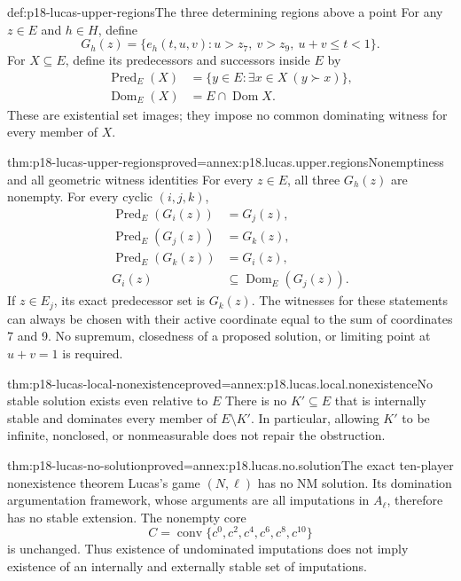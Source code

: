 \begin{hbdefinition}{def:p18-lucas-upper-regions}{The three determining regions above a point}
For any \(z\in E\) and \(h\in H\), define
\[
 G_h(z)=\{e_h(t,u,v):u>z_7,\ v>z_9,\ u+v\leq t<1\}.
\]
For \(X\subseteq E\), define its predecessors and successors
inside \(E\) by
\[
\begin{aligned}
 \operatorname{Pred}_E(X)&=\{y\in E:\exists x\in X\ (y\succ x)\},\\
 \operatorname{Dom}_E(X)&=E\cap\operatorname{Dom}X.
\end{aligned}
\]
These are existential set images; they impose no common
dominating witness for every member of \(X\).
\end{hbdefinition}

\begin{hblemma}{thm:p18-lucas-upper-regions}{proved=annex:p18.lucas.upper.regions}{Nonemptiness and all geometric witness identities}
For every \(z\in E\), all three \(G_h(z)\) are nonempty. For
every cyclic \((i,j,k)\),
\[
\begin{aligned}
 \operatorname{Pred}_E(G_i(z))&=G_j(z),\\
 \operatorname{Pred}_E(G_j(z))&=G_k(z),\\
 \operatorname{Pred}_E(G_k(z))&=G_i(z),\\
 G_i(z)&\subseteq\operatorname{Dom}_E(G_j(z)).
\end{aligned}
\]
If \(z\in E_j\), its exact predecessor set is \(G_k(z)\).
The witnesses for these statements can always be chosen with
their active coordinate equal to the sum of coordinates 7 and
9. No supremum, closedness of a proposed solution, or limiting
point at \(u+v=1\) is required.
\end{hblemma}

\begin{hbtheorem}{thm:p18-lucas-local-nonexistence}{proved=annex:p18.lucas.local.nonexistence}{No stable solution exists even relative to \(E\)}
There is no \(K'\subseteq E\) that is internally stable and
dominates every member of \(E\setminus K'\). In particular,
allowing \(K'\) to be infinite, nonclosed, or nonmeasurable
does not repair the obstruction.
\end{hbtheorem}

\begin{hbtheorem}{thm:p18-lucas-no-solution}{proved=annex:p18.lucas.no.solution}{The exact ten-player nonexistence theorem}
Lucas's game \((N,\ell)\) has no NM solution. Its domination
argumentation framework, whose arguments are all imputations
in \(A_\ell\), therefore has no stable extension.
The nonempty core
\[
 C=\operatorname{conv}\{c^0,c^2,c^4,c^6,c^8,c^{10}\}
\]
is unchanged. Thus existence of undominated imputations does
not imply existence of an internally and externally stable
set of imputations.
\end{hbtheorem}


